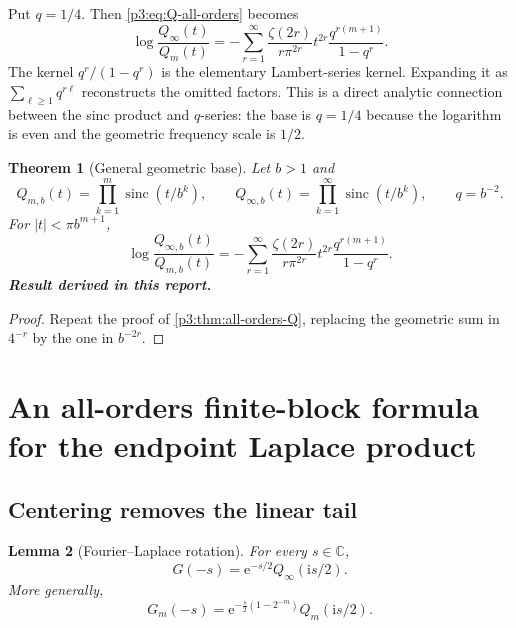 \documentclass[11pt,oneside]{article}
\numberwithin{equation}{section}
\newtheorem{theorem}{Theorem}[section]
\newtheorem{lemma}[theorem]{Lemma}
\theoremstyle{definition}
\theoremstyle{remark}
\newcommand{\C}{\mathbb C}
\newcommand{\sinc}{\operatorname{sinc}}
\newcommand{\e}{\mathrm e}
\newcommand{\ii}{\mathrm i}
\newcommand{\newresult}{\textbf{Result derived in this report.}}
\begin{document}
Put $q=1/4$.  Then \eqref{p3:eq:Q-all-orders} becomes
\begin{equation}
 \log\frac{Q_\infty(t)}{Q_m(t)}
 =-\sum_{r=1}^{\infty}
 \frac{\zeta(2r)}{r\pi^{2r}}t^{2r}
 \frac{q^{r(m+1)}}{1-q^r}.
 \label{p3:eq:Q-Lambert}
\end{equation}
The kernel $q^r/(1-q^r)$ is the elementary Lambert-series kernel.  Expanding it as
$\sum_{\ell\ge1}q^{r\ell}$ reconstructs the omitted factors.  This is a direct analytic
connection between the sinc product and $q$-series: the base is $q=1/4$ because the logarithm
is even and the geometric frequency scale is $1/2$.

\begin{theorem}[General geometric base]
\label{p3:thm:base-b}
Let $b>1$ and
\[
 Q_{m,b}(t)=\prod_{k=1}^{m}\sinc(t/b^k),\qquad
 Q_{\infty,b}(t)=\prod_{k=1}^{\infty}\sinc(t/b^k),\qquad q=b^{-2}.
\]
For $|t|<\pi b^{m+1}$,
\begin{equation}
 \boxed{
 \log\frac{Q_{\infty,b}(t)}{Q_{m,b}(t)}
 =-\sum_{r=1}^{\infty}\frac{\zeta(2r)}{r\pi^{2r}}t^{2r}
 \frac{q^{r(m+1)}}{1-q^r}.}
 \label{p3:eq:base-b}
\end{equation}
\newresult
\end{theorem}

\begin{proof}
Repeat the proof of \cref{p3:thm:all-orders-Q}, replacing the geometric sum in $4^{-r}$ by the
one in $b^{-2r}$.
\end{proof}

\section{An all-orders finite-block formula for the endpoint Laplace product}
\label{p3:sec:Laplace-tail}

\subsection{Centering removes the linear tail}

\begin{lemma}[Fourier--Laplace rotation]
\label{p3:lem:GQ}
For every $s\in\C$,
\begin{equation}
 \boxed{G(-s)=\e^{-s/2}Q_\infty(\ii s/2).}
 \label{p3:eq:GQ}
\end{equation}
More generally,
\begin{equation}
 G_m(-s)=\e^{-\frac{s}{2}(1-2^{-m})}Q_m(\ii s/2).
 \label{p3:eq:GmQm}
\end{equation}
\end{lemma}
\end{document}
